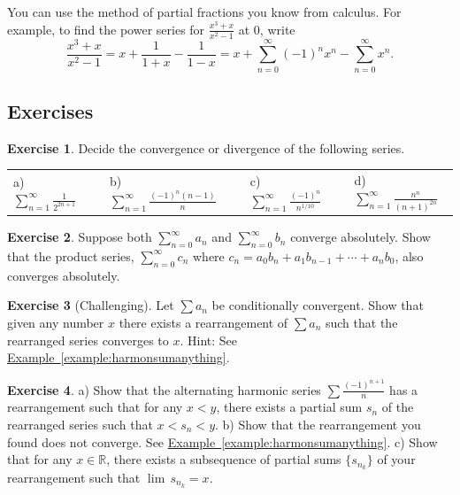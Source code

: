 \documentclass[12pt]{book}
\newcommand{\R}{{\mathbb{R}}}
\theoremstyle{plain}
\theoremstyle{remark}
\theoremstyle{definition}
\theoremstyle{exercise}
\newtheorem{exercise}{Exercise}[section]
\theoremstyle{example}
\newcommand{\exampleref}[1]{\hyperref[#1]{Example~\ref*{#1}}}
\begin{document}
You can use the method of partial fractions you know from calculus.
For example, to find the power series for $\frac{x^3+x}{x^2-1}$ at 0, write
\begin{equation*}
\frac{x^3+x}{x^2-1}
=
x + \frac{1}{1+x} - \frac{1}{1-x}
=
x + \sum_{n=0}^\infty {(-1)}^n x^n - \sum_{n=0}^\infty x^n .
\end{equation*}

\subsection{Exercises}

\begin{exercise}
Decide the convergence or divergence of the following series.

\medskip

\noindent
\begin{tabular}{lllllll}
a)
$\displaystyle \sum_{n=1}^\infty \frac{1}{2^{2n+1}}$
& &
b)
$\displaystyle \sum_{n=1}^\infty \frac{{(-1)}^{n}(n-1)}{n}$
& &
c)
$\displaystyle \sum_{n=1}^\infty \frac{{(-1)}^n}{n^{1/10}}$
& &
d)
$\displaystyle \sum_{n=1}^\infty \frac{n^n}{{(n+1)}^{2n}}$
\end{tabular}
\end{exercise}

\begin{exercise}
Suppose both $\sum_{n=0}^\infty a_n$ and $\sum_{n=0}^\infty b_n$ 
converge absolutely.
Show that the product series, $\sum_{n=0}^\infty c_n$ where
$c_n = a_0 b_n + a_1 b_{n-1} + \cdots + a_n b_0$, also converges absolutely.
\end{exercise}

\begin{exercise}[Challenging] \label{exercise:seriesconvergestoanything}
Let $\sum a_n$ be conditionally convergent.
Show that given any number $x$
there exists a rearrangement of $\sum a_n$
such that the rearranged series converges to $x$.
Hint: See \exampleref{example:harmonsumanything}.
\end{exercise}

\begin{exercise}
a) Show that the alternating harmonic series $\sum
\frac{{(-1)}^{n+1}}{n}$ has a rearrangement
such that for any $x < y$, there exists a partial sum $s_n$
of the rearranged series such that $x < s_n < y$.
b) Show that the rearrangement you found does not converge.
See \exampleref{example:harmonsumanything}.
c) Show that for any $x \in \R$, there exists a subsequence of
partial sums $\{ s_{n_k} \}$ of your rearrangement such that 
$\lim \, s_{n_k} = x$.
\end{exercise}
\end{document}
